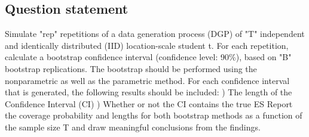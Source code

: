 \documentclass[12pt]{article}
\begin{document}
\subsection*{Question statement}
Simulate "rep" repetitions of a data generation process (DGP) of "T" independent and identically distributed (IID) location-scale student t. For each repetition, calculate a bootstrap confidence interval (confidence level: 90\%), based on "B" bootstrap replications. The bootstrap should be performed using the nonparametric as well as the parametric method.
\newline \newline
For each confidence interval that is generated, the following results should be included:
) The length of the Confidence Interval (CI) ) Whether or not the CI contains the true ES \newline \newline
Report the coverage probability and lengths for both bootstrap methods as a function of the sample size T and draw meaningful conclusions from the findings.
\end{document}
